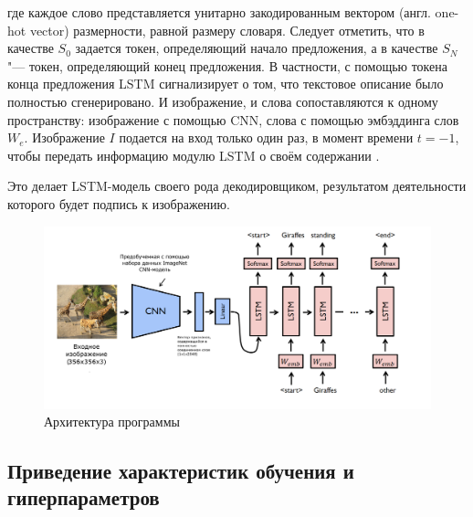 \documentclass[bachelor, och, coursework]{SCWorks}
\begin{document}
        где каждое слово представляется унитарно закодированным вектором (англ.
        one-hot vector) размерности, равной размеру словаря. Следует отметить,
        что в качестве $S_0$ задается токен, определяющий начало предложения, а
        в качестве $S_N$ "--- токен, определяющий конец предложения. В
        частности, с помощью токена конца предложения LSTM сигнализирует о том,
        что текстовое описание было полностью сгенерировано. И изображение, и
        слова сопоставляются к одному пространству: изображение с помощью CNN,
        слова с помощью эмбэддинга слов $W_e$. Изображение $I$ подается на вход
        только один раз, в момент времени $t = -1$, чтобы передать информацию
        модулю LSTM о своём содержании \cite{dataset1}.

        Это делает LSTM-модель своего рода декодировщиком, результатом
        деятельности которого будет подпись к изображению.

        \begin{figure}[H]
            \centering
            \includegraphics[width=1\textwidth]{pics/arch.png}
            \caption{Архитектура программы}
        \end{figure}

    \subsection{Приведение характеристик обучения и гиперпараметров}
\end{document}
